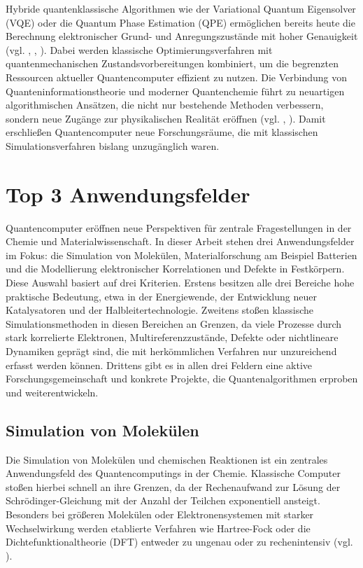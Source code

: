 {Hybride quantenklassische Algorithmen wie der Variational Quantum Eigensolver (VQE) oder die Quantum Phase Estimation (QPE) ermöglichen bereits heute die Berechnung elektronischer Grund- und Anregungszustände mit hoher Genauigkeit (vgl. \cite{aspuru-guzik_simulated_2005}, \cite{weidman_quantum_2024}, \cite{cao_quantum_2019}). Dabei werden klassische Optimierungsverfahren mit quantenmechanischen Zustandsvorbereitungen kombiniert, um die begrenzten Ressourcen aktueller Quantencomputer effizient zu nutzen.\newline\newline
Die Verbindung von Quanteninformationstheorie und moderner Quantenchemie führt zu neuartigen algorithmischen Ansätzen, die nicht nur bestehende Methoden verbessern, sondern neue Zugänge zur physikalischen Realität eröffnen (vgl. \cite{liu_quantum_2020}, \cite{weidman_quantum_2024}). Damit erschließen Quantencomputer neue Forschungsräume, die mit klassischen Simulationsverfahren bislang unzugänglich waren.}

\section{Top 3 Anwendungsfelder}
{Quantencomputer eröffnen neue Perspektiven für zentrale Fragestellungen in der Chemie und Materialwissenschaft. In dieser Arbeit stehen drei Anwendungsfelder im Fokus: die Simulation von Molekülen, Materialforschung am Beispiel Batterien und die Modellierung elektronischer Korrelationen und Defekte in Festkörpern.
Diese Auswahl basiert auf drei Kriterien. Erstens besitzen alle drei Bereiche hohe praktische Bedeutung, etwa in der Energiewende, der Entwicklung neuer Katalysatoren und der Halbleitertechnologie. Zweitens stoßen klassische Simulationsmethoden in diesen Bereichen an Grenzen, da viele Prozesse durch stark korrelierte Elektronen, Multireferenzzustände, Defekte oder nichtlineare Dynamiken geprägt sind, die mit herkömmlichen Verfahren nur unzureichend erfasst werden können. Drittens gibt es in allen drei Feldern eine aktive Forschungsgemeinschaft und konkrete Projekte, die Quantenalgorithmen erproben und weiterentwickeln.}

\subsection{Simulation von Molekülen}
{Die Simulation von Molekülen und chemischen Reaktionen ist ein zentrales Anwendungsfeld des Quantencomputings in der Chemie. Klassische Computer stoßen hierbei schnell an ihre Grenzen, da der Rechenaufwand zur Lösung der Schrödinger-Gleichung mit der Anzahl der Teilchen exponentiell ansteigt. Besonders bei größeren Molekülen oder Elektronensystemen mit starker Wechselwirkung werden etablierte Verfahren wie Hartree-Fock oder die Dichtefunktionaltheorie (DFT) entweder zu ungenau oder zu rechenintensiv (vgl. \cite{bauer_quantum_2020}).}

